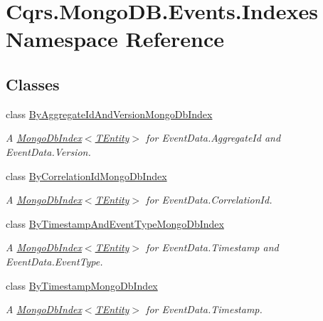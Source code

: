 \hypertarget{namespaceCqrs_1_1MongoDB_1_1Events_1_1Indexes}{}\section{Cqrs.\+Mongo\+D\+B.\+Events.\+Indexes Namespace Reference}
\label{namespaceCqrs_1_1MongoDB_1_1Events_1_1Indexes}
\subsection*{Classes}
\begin{DoxyCompactItemize}
\item 
class \hyperlink{classCqrs_1_1MongoDB_1_1Events_1_1Indexes_1_1ByAggregateIdAndVersionMongoDbIndex}{By\+Aggregate\+Id\+And\+Version\+Mongo\+Db\+Index}
\begin{DoxyCompactList}\small\item\em A \hyperlink{classCqrs_1_1MongoDB_1_1DataStores_1_1Indexes_1_1MongoDbIndex_a61f4b17dd968f92e81562c70ae062a89_a61f4b17dd968f92e81562c70ae062a89}{Mongo\+Db\+Index$<$\+T\+Entity$>$} for Event\+Data.\+Aggregate\+Id and Event\+Data.\+Version. \end{DoxyCompactList}\item 
class \hyperlink{classCqrs_1_1MongoDB_1_1Events_1_1Indexes_1_1ByCorrelationIdMongoDbIndex}{By\+Correlation\+Id\+Mongo\+Db\+Index}
\begin{DoxyCompactList}\small\item\em A \hyperlink{classCqrs_1_1MongoDB_1_1DataStores_1_1Indexes_1_1MongoDbIndex_a61f4b17dd968f92e81562c70ae062a89_a61f4b17dd968f92e81562c70ae062a89}{Mongo\+Db\+Index$<$\+T\+Entity$>$} for Event\+Data.\+Correlation\+Id. \end{DoxyCompactList}\item 
class \hyperlink{classCqrs_1_1MongoDB_1_1Events_1_1Indexes_1_1ByTimestampAndEventTypeMongoDbIndex}{By\+Timestamp\+And\+Event\+Type\+Mongo\+Db\+Index}
\begin{DoxyCompactList}\small\item\em A \hyperlink{classCqrs_1_1MongoDB_1_1DataStores_1_1Indexes_1_1MongoDbIndex_a61f4b17dd968f92e81562c70ae062a89_a61f4b17dd968f92e81562c70ae062a89}{Mongo\+Db\+Index$<$\+T\+Entity$>$} for Event\+Data.\+Timestamp and Event\+Data.\+Event\+Type. \end{DoxyCompactList}\item 
class \hyperlink{classCqrs_1_1MongoDB_1_1Events_1_1Indexes_1_1ByTimestampMongoDbIndex}{By\+Timestamp\+Mongo\+Db\+Index}
\begin{DoxyCompactList}\small\item\em A \hyperlink{classCqrs_1_1MongoDB_1_1DataStores_1_1Indexes_1_1MongoDbIndex_a61f4b17dd968f92e81562c70ae062a89_a61f4b17dd968f92e81562c70ae062a89}{Mongo\+Db\+Index$<$\+T\+Entity$>$} for Event\+Data.\+Timestamp. \end{DoxyCompactList}\end{DoxyCompactItemize}
